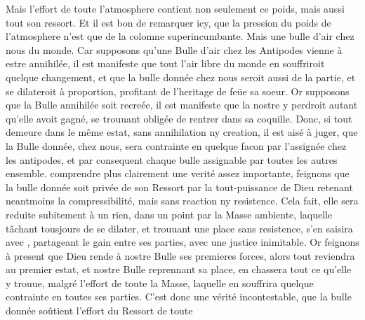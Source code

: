 \pstart[144 v\textsuperscript{o}] Mais l'effort de toute l'atmosphere\protect{} contient non seulement ce poids\protect{}, mais aussi tout son ressort. Et il est bon de remarquer icy, que la pression du poids\protect{} de l'atmosphere\protect{} n'est que de la colomne superincumbante. Mais une bulle d'air  chez nous  du monde. Car supposons qu'une Bulle d'air chez les Antipodes\protect{} vienne \`{a} estre annihil\'{e}e, il est manifeste que tout l'air libre du monde en souffriroit quelque changement, et que la bulle donn\'{e}e chez nous seroit aussi de la partie, et se dilateroit \`{a} proportion, profitant de l'heritage de fe\"{u}e sa soeur. Or supposons que la Bulle annihil\'{e}e soit recre\'{e}e, il est manifeste que la nostre y perdroit autant qu'elle avoit gagn\'{e}, se trouuant oblig\'{e}e de rentrer dans sa coquille. Donc, si tout demeure dans le même estat, sans annihilation ny creation, il est ais\'{e} \`{a} juger, que la Bulle donn\'{e}e, chez nous, sera contrainte en quelque facon par l'assign\'{e}e chez les antipodes, et par consequent chaque bulle assignable  par toutes les autres ensemble.  comprendre plus clairement une verit\'{e} assez importante, feignons que la bulle donn\'{e}e soit priv\'{e}e de son Ressort par la tout-puissance de Dieu retenant neantmoins la compressibilit\'{e}, mais sans reaction ny resistence. Cela fait, elle sera reduite subitement \`{a} un rien,  dans un point par  la Masse ambiente, laquelle tâchant tousjours de se dilater, et trouuant une place sans resistence, s'en saisira avec , partageant le gain entre ses parties, avec une justice inimitable. Or feignons \`{a} present que Dieu rende \`{a} nostre Bulle ses premieres forces, alors tout reviendra au premier estat, et nostre Bulle reprennant sa place, en chassera tout ce qu'elle y trouue, malgr\'{e} l'effort de toute la Masse, laquelle en souffrira quelque contrainte en toutes ses parties. C'est donc une v\'{e}rit\'{e} incontestable, que la bulle donn\'{e}e soûtient l'effort du Ressort de toute 